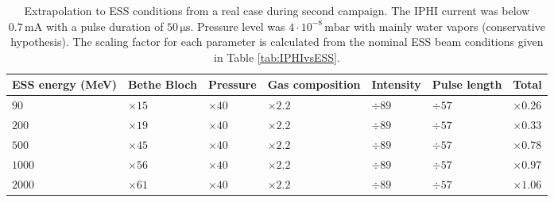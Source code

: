 \begin{table}[ht]
  \centering
  \caption[Extrapolation to ESS conditions from a real case during the second campaign]
  {Extrapolation to ESS conditions from a real case during second campaign.
    The IPHI current was below $0.7\,\mathrm{mA}$ with a pulse duration of $50\, \mathrm{\mu s}$. Pressure level was $4 \cdot 10^{-8}\,\mathrm{mbar}$ with mainly water vapors (conservative hypothesis).
    The scaling factor for each parameter is calculated from the nominal ESS beam conditions given in Table \ref{tab:IPHIvsESS}.}
  \label{chap4:extrapolationMCP}
  \begin{tabularx}{\linewidth}{XXXXXXX}
    \toprule    ESS energy (MeV) & Bethe Bloch & Pressure     & Gas composition & Intensity & Pulse length & Total         \\
    \midrule
    $ 90$                        & $\times 15$ & $\times 40 $ & $\times 2.2$    & $\div89$  & $\div57$     & $\times 0.26$ \\
    $ 200 $                      & $\times 19$ & $\times 40$  & $\times 2.2$    & $\div89$  & $\div57$     & $\times 0.33$ \\
    $500$                        & $\times 45$ & $\times 40$  & $\times 2.2$    & $\div89$  & $\div57$     & $\times 0.78$ \\
    $1000$                       & $\times 56$ & $\times 40$  & $\times 2.2$    & $\div89$  & $\div57$     & $\times 0.97$ \\
    $2000$                       & $\times 61$ & $\times 40$  & $\times 2.2$    & $\div89$  & $\div57$     & $\times 1.06$ \\
    \bottomrule
  \end{tabularx}
\end{table}